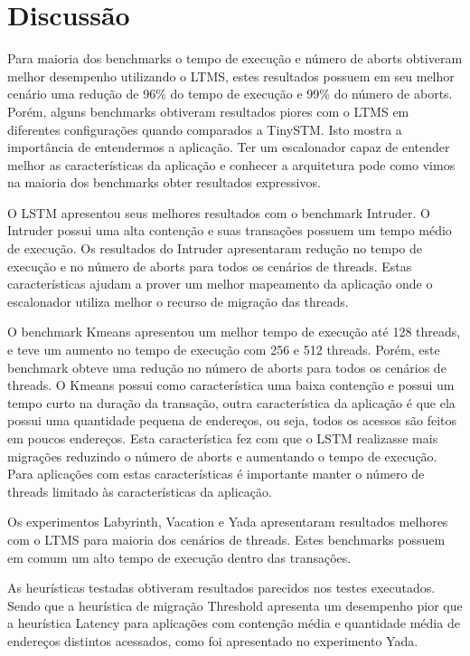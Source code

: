 \documentclass[diss,capa]{texufpel}
\begin{document}


\section{Discussão}

Para maioria dos benchmarks o tempo de execução e número de aborts obtiveram melhor desempenho utilizando o LTMS, estes resultados possuem em seu melhor cenário uma redução de 96\% do tempo de execução e 99\% do número de aborts. Porém, alguns benchmarks obtiveram resultados piores com o LTMS em diferentes configurações quando comparados a TinySTM. Isto mostra a importância de entendermos a aplicação. Ter um escalonador capaz de entender melhor as características da aplicação e conhecer a arquitetura pode como vimos na maioria dos benchmarks obter resultados expressivos.

O LSTM apresentou seus melhores resultados com o benchmark Intruder. O Intruder possui uma alta contenção e suas transações possuem um tempo médio de execução. Os resultados do Intruder apresentaram redução no tempo de execução e no número de aborts para todos os cenários de threads. Estas características ajudam a prover um melhor mapeamento da aplicação onde o escalonador utiliza melhor o recurso de migração das threads.

O benchmark Kmeans apresentou um melhor tempo de execução até 128 threads, e teve um aumento no tempo de execução com 256 e 512 threads. Porém, este benchmark obteve uma redução no número de aborts para todos os cenários de threads. O Kmeans possui como característica uma baixa contenção e possui um tempo curto na duração da transação, outra característica da aplicação é que ela possui uma quantidade pequena de endereços, ou seja, todos os acessos são feitos em poucos endereços. Esta característica fez com que o LSTM realizasse mais migrações reduzindo o número de aborts e aumentando o tempo de execução. Para aplicações com estas características é importante manter o número de threads limitado às características da aplicação.

Os experimentos Labyrinth, Vacation e Yada apresentaram resultados melhores com o LTMS para maioria dos cenários de threads. Estes benchmarks possuem em comum um alto tempo de execução dentro das transações.

As heurísticas testadas obtiveram resultados parecidos nos testes executados. Sendo que a heurística de migração Threshold apresenta um desempenho pior que a heurística Latency para aplicações com contenção média e quantidade média de endereços distintos acessados, como foi apresentado no experimento Yada.
\end{document}
